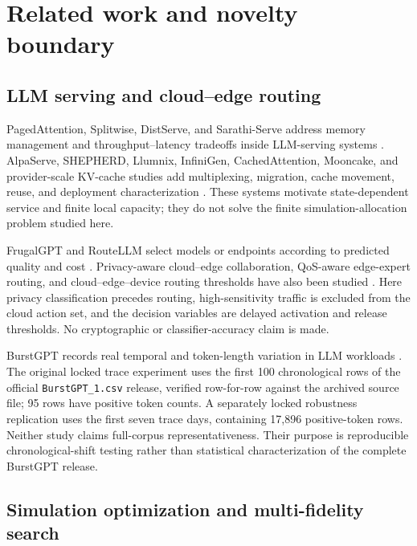 \documentclass[preprint,12pt]{elsarticle}
\begin{document}
\section{Related work and novelty boundary}
\label{sec:related}

\subsection{LLM serving and cloud--edge routing}

PagedAttention, Splitwise, DistServe, and Sarathi-Serve address memory management and throughput--latency tradeoffs inside LLM-serving systems \cite{kwon2023pagedattention,patel2024splitwise,zhong2024distserve,agrawal2024sarathi}. AlpaServe, SHEPHERD, Llumnix, InfiniGen, CachedAttention, Mooncake, and provider-scale KV-cache studies add multiplexing, migration, cache movement, reuse, and deployment characterization \cite{alpaserve2023,shepherd2023,llumnix2024,infinigen2024,cachedattention2024,mooncake2025,kvcachewild2025}. These systems motivate state-dependent service and finite local capacity; they do not solve the finite simulation-allocation problem studied here.

FrugalGPT and RouteLLM select models or endpoints according to predicted quality and cost \cite{frugalgpt2024,routellm2025}. Privacy-aware cloud--edge collaboration, QoS-aware edge-expert routing, and cloud--edge--device routing thresholds have also been studied \cite{prism2026,qosrouting2025,consroute2026}. Here privacy classification precedes routing, high-sensitivity traffic is excluded from the cloud action set, and the decision variables are delayed activation and release thresholds. No cryptographic or classifier-accuracy claim is made.

BurstGPT records real temporal and token-length variation in LLM workloads \cite{burstgpt2025}. The original locked trace experiment uses the first 100 chronological rows of the official \texttt{BurstGPT\_1.csv} release, verified row-for-row against the archived source file; 95 rows have positive token counts. A separately locked robustness replication uses the first seven trace days, containing 17,896 positive-token rows. Neither study claims full-corpus representativeness. Their purpose is reproducible chronological-shift testing rather than statistical characterization of the complete BurstGPT release.

\subsection{Simulation optimization and multi-fidelity search}
\end{document}
